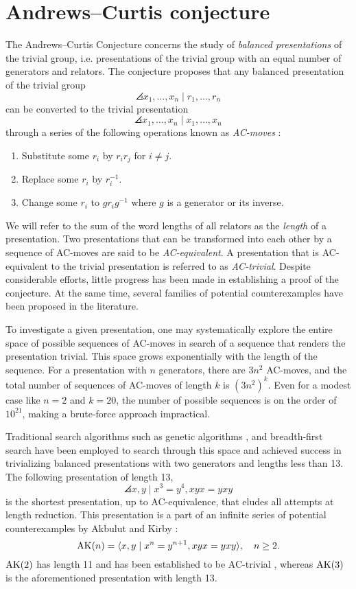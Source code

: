 
\section{Andrews--Curtis conjecture\label{sec:AC}}

The Andrews--Curtis Conjecture concerns the study of \textit{balanced presentations} of the trivial group, i.e.
presentations of the trivial group with an equal number of generators and relators.
The conjecture proposes that any balanced presentation of the trivial group
\[
\angles{x_1, \dots, x_n \mid r_1, \dots, r_n}
\]
can be converted to the trivial presentation
\[
\angles{x_1, \dots, x_n \mid x_1, \dots, x_n}
\]
through a series of the following operations known as \textit{AC-moves} \cite{Andrews--Curtis}:
\begin{enumerate}[label=(AC\arabic*)]
	\item Substitute some $r_i$ by $r_i r_j$ for $i \neq j$.
	\item Replace some $r_i$ by $r_i^{-1}$.
	\item Change some $r_i$ to $g r_i g^{-1}$ where $g$ is a generator or its inverse.
\end{enumerate}

We will refer to the sum of the word lengths of all relators as the \textit{length} of a presentation.
Two presentations that can be transformed into each other by a sequence of AC-moves are said to be \textit{AC-equivalent}.
A presentation that is AC-equivalent to the trivial presentation is referred to as \textit{AC-trivial}.
Despite considerable efforts, little progress has been made in establishing a proof of the conjecture.
At the same time, several families of potential counterexamples have been proposed in the literature.

To investigate a given presentation, one may systematically explore the entire space of possible sequences of AC-moves in search of a sequence that renders the presentation trivial.
This space grows exponentially with the length of the sequence.
For a presentation with $n$ generators, there are $3n^2$ AC-moves, and the total number of sequences of AC-moves of length $k$ is $(3n^2)^k$.
Even for a modest case like $n=2$ and $k=20$, the number of possible sequences is on the order of $10^{21}$, making a brute-force approach impractical.

Traditional search algorithms such as genetic algorithms \cite{genetic}, and breadth-first search \cite{bfs-ac} have been employed to search through this space and achieved success in trivializing balanced presentations with two generators and lengths less than 13.
The following presentation of length 13,
\[
\angles{x, y \mid x^3 = y^4, xyx = yxy}
\]
is the shortest presentation, up to AC-equivalence, that eludes all attempts at length reduction.
This presentation is a part of an infinite series of potential counterexamples by Akbulut and Kirby \cite{Akbulut--Kirby}:
\[
\text{AK}(n) = \langle x, y \mid x^n = y^{n+1}, xyx = yxy\rangle, \quad n \geq 2.
\]
$\text{AK}(2)$ has length 11 and has been established to be AC-trivial \cite{genetic}, whereas $\text{AK}(3)$ is the aforementioned presentation with length 13.

